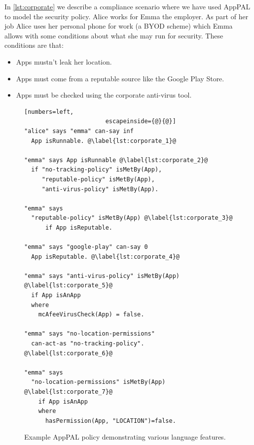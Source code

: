 \documentclass{scrartcl}
\begin{document}
In \autoref{lst:corporate} we describe a compliance scenario where we have used AppPAL to model the security policy.
Alice works for Emma the employer.
As part of her job Alice uses her personal phone for work (a \ac{BYOD} scheme) which Emma allows with some conditions about what she may run for security.
These conditions are that:
\begin{itemize}
  \item Apps mustn't leak her location.
  \item Apps must come from a reputable source like the Google Play Store.
  \item Apps must be checked using the corporate anti-virus tool.
\end{itemize}

\begin{figure}
    \begin{lstlisting}[numbers=left,
                       escapeinside={@}{@}]
"alice" says "emma" can-say inf
  App isRunnable. @\label{lst:corporate_1}@

"emma" says App isRunnable @\label{lst:corporate_2}@
  if "no-tracking-policy" isMetBy(App),
     "reputable-policy" isMetBy(App),
     "anti-virus-policy" isMetBy(App).

"emma" says
  "reputable-policy" isMetBy(App) @\label{lst:corporate_3}@
      if App isReputable.

"emma" says "google-play" can-say 0
  App isReputable. @\label{lst:corporate_4}@

"emma" says "anti-virus-policy" isMetBy(App) @\label{lst:corporate_5}@
  if App isAnApp
  where
    mcAfeeVirusCheck(App) = false.

"emma" says "no-location-permissions"
  can-act-as "no-tracking-policy". @\label{lst:corporate_6}@

"emma" says
  "no-location-permissions" isMetBy(App) @\label{lst:corporate_7}@
    if App isAnApp
    where
      hasPermission(App, "LOCATION")=false.
\end{lstlisting}
\caption{Example AppPAL policy demonstrating various language features.}
\label{lst:corporate}
\end{figure}
\end{document}
